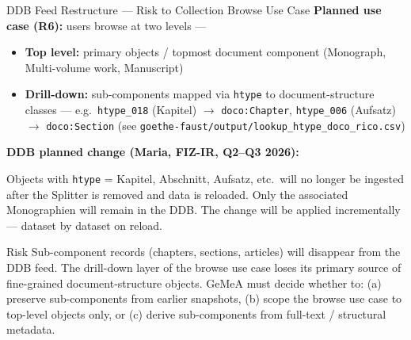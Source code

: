 \documentclass[xcolor,aspectratio=169,compress]{beamer}
\begin{document}
\begin{frame}[shrink=10]{DDB Feed Restructure --- Risk to Collection Browse Use Case}
  \small
  \textbf{Planned use case (R6):} users browse at two levels ---
  \begin{itemize}\setlength{\itemsep}{2pt}
    \item \textbf{Top level:} primary objects / topmost document component
          (Monograph, Multi-volume work, Manuscript)
    \item \textbf{Drill-down:} sub-components mapped via \texttt{htype} to document-structure classes ---
          e.g.\ \texttt{htype\_018} (Kapitel) $\to$ \texttt{doco:Chapter},
          \texttt{htype\_006} (Aufsatz) $\to$ \texttt{doco:Section}
          (see \texttt{goethe-faust/output/lookup\_htype\_doco\_rico.csv})
  \end{itemize}

  \medskip
  \textbf{DDB planned change (Maria, FIZ-IR, Q2--Q3 2026):}
  \begin{block}{}
    \footnotesize
    Objects with \texttt{htype} = Kapitel, Abschnitt, Aufsatz, etc.\ will no longer be ingested
    after the Splitter is removed and data is reloaded.
    Only the associated Monographien will remain in the DDB.
    The change will be applied incrementally --- dataset by dataset on reload.
  \end{block}

  \begin{alertblock}{Risk}
    \small Sub-component records (chapters, sections, articles) will disappear from the DDB feed.
    The drill-down layer of the browse use case loses its primary source of
    fine-grained document-structure objects.
    GeMeA must decide whether to: (a) preserve sub-components from earlier snapshots,
    (b) scope the browse use case to top-level objects only, or
    (c) derive sub-components from full-text / structural metadata.
  \end{alertblock}
\end{frame}
\end{document}
